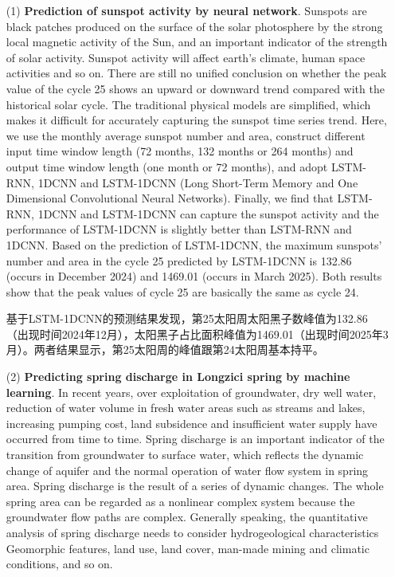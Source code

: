 \begin{enumerate}

  \item[(1)] \textbf{Prediction of sunspot activity by neural network}. Sunspots are black patches produced on the surface of the solar photosphere by the strong local magnetic activity of the Sun, and an important indicator of the strength of solar activity. Sunspot activity will affect earth's climate, human space activities and so on. There are still no unified conclusion on whether the peak value of the cycle 25 shows an upward or downward trend compared with the historical solar cycle. The traditional physical models are simplified, which makes it difficult for accurately capturing the sunspot time series trend. Here, we use the monthly average sunspot number and area, construct different input time window length (72 months, 132 months or 264 months) and output time window length (one month or 72 months), and adopt LSTM-RNN, 1DCNN and LSTM-1DCNN (Long Short-Term Memory and One Dimensional Convolutional Neural Networks).
  Finally, we find that LSTM-RNN, 1DCNN and LSTM-1DCNN can capture the sunspot activity and the performance of LSTM-1DCNN is slightly better than LSTM-RNN and 1DCNN. Based on the prediction of LSTM-1DCNN, the maximum sunspots' number and area in the cycle 25 predicted by LSTM-1DCNN is 132.86 (occurs in December 2024) and 1469.01 (occurs in March 2025). Both results show that the peak values of cycle 25 are basically the same as cycle 24. 

基于LSTM-1DCNN的预测结果发现，第25太阳周太阳黑子数峰值为132.86（出现时间2024年12月），太阳黑子占比面积峰值为1469.01（出现时间2025年3月）。两者结果显示，第25太阳周的峰值跟第24太阳周基本持平。

  \item[(2)] \textbf{Predicting spring discharge in Longzici spring by machine learning}. In recent years, over exploitation of groundwater, dry well water, reduction of water volume in fresh water areas such as streams and lakes, increasing pumping cost, land subsidence and insufficient water supply have occurred from time to time. Spring discharge is an important indicator of the transition from groundwater to surface water, which reflects the dynamic change of aquifer and the normal operation of water flow system in spring area. Spring discharge is the result of a series of dynamic changes. The whole spring area can be regarded as a nonlinear complex system because the groundwater flow paths are complex. Generally speaking, the quantitative analysis of spring discharge needs to consider hydrogeological characteristics Geomorphic features, land use, land cover, man-made mining and climatic conditions, and so on.
  

\end{enumerate}
